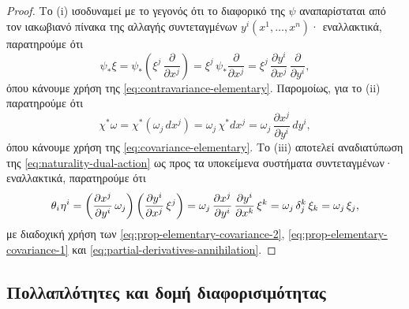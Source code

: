 \documentclass[11pt,a4paper,twoside,openright]{book}
\begin{document}
\begin{proof}
Το (i) ισοδυναμεί με το γεγονός ότι το διαφορικό της $\psi$ αναπαρίσταται από τον ιακωβιανό πίνακα της αλλαγής συντεταγμένων $y^i(x^1, \dots, x^n)$· εναλλακτικά, παρατηρούμε ότι
\begin{equation*}
\psi_* \xi
=
\psi_* \left( \xi^j \, \frac{\partial}{\partial x^j} \right)
=
\xi^j \, \psi_* \frac{\partial}{\partial x^j}
=
\xi^j \, \frac{\partial y^i}{\partial x^j} \, \frac{\partial}{\partial y^i},
\end{equation*}
όπου κάνουμε χρήση της \eqref{eq:contravariance-elementary}.
Παρομοίως, για το (ii) παρατηρούμε ότι
\begin{equation*}
\chi^* \omega
=
\chi^* \left( \omega_j \, dx^j \right)
=
\omega_j \, \chi^* dx^j
=
\omega_j \, \frac{\partial x^j}{\partial y^i} \, dy^i,
\end{equation*}
όπου κάνουμε χρήση της \eqref{eq:covariance-elementary}.
Το (iii) αποτελεί αναδιατύπωση της \eqref{eq:naturality-dual-action} ως προς τα υποκείμενα συστήματα συντεταγμένων·
εναλλακτικά, παρατηρούμε ότι
\begin{equation*}
\theta_i \hspace{.5pt} \eta^i
=
\left(\frac{\partial x^j}{\partial y^i} \, \omega_j\right)
\left(\frac{\partial y^i}{\partial x^j} \, \xi^j\right)
=
\omega_j
\, \frac{\partial x^j}{\partial y^i}
\, \frac{\partial y^i}{\partial x^k}
\, \xi^k
=
\omega_j
\, \delta_j^k
\, \xi_k
=
\omega_j \, \xi_j,
\end{equation*}
με διαδοχική χρήση των
\eqref{eq:prop-elementary-covariance-2}, \eqref{eq:prop-elementary-covariance-1} και \eqref{eq:partial-derivatives-annihilation}.
\end{proof}

\subsection{Πολλαπλότητες και δομή διαφορισιμότητας}
	\label{sec:differentiability-structure}
\end{document}
